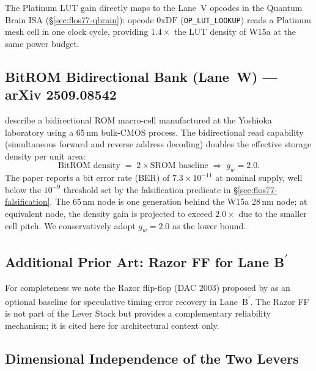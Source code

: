 The Platinum LUT gain directly maps to the Lane~V opcodes in the Quantum Brain
ISA (§\ref{sec:flos77-qbrain}): opcode $0\text{xDF}$ (\texttt{OP\_LUT\_LOOKUP})
reads a Platinum mesh cell in one clock cycle, providing $1.4\times$ the
LUT density of W15a at the same power budget.

\subsection{BitROM Bidirectional Bank (Lane~W) --- arXiv 2509.08542}

\citet{bitrom_2025} describe a bidirectional ROM macro-cell manufactured
at the Yoshioka laboratory using a 65\,nm bulk-CMOS process.
The bidirectional read capability (simultaneous forward and reverse address decoding)
doubles the effective storage density per unit area:
%
\begin{equation}
  \label{eq:bitrom-density}
  \text{BitROM density} \;=\; 2 \times \text{SROM baseline}
  \;\Rightarrow\; g_w = 2.0.
\end{equation}
%
The paper reports a bit error rate (BER) of $7.3 \times 10^{-11}$ at nominal
supply, well below the $10^{-9}$ threshold set by the falsification predicate
in §\ref{sec:flos77-falsification}.
The 65\,nm node is one generation behind the W15a 28\,nm node; at equivalent node,
the density gain is projected to exceed $2.0\times$ due to the smaller cell pitch.
We conservatively adopt $g_w = 2.0$ as the lower bound.

\subsection{Additional Prior Art: Razor FF for Lane B\textsuperscript{$\prime$}}

For completeness we note the Razor flip-flop (DAC 2003) proposed by
\citet{ernst2003razor} as an optional baseline for speculative timing error
recovery in Lane~B\textsuperscript{$\prime$}.
The Razor FF is not part of the Lever Stack but provides a complementary
reliability mechanism; it is cited here for architectural context only.

\subsection{Dimensional Independence of the Two Levers}

